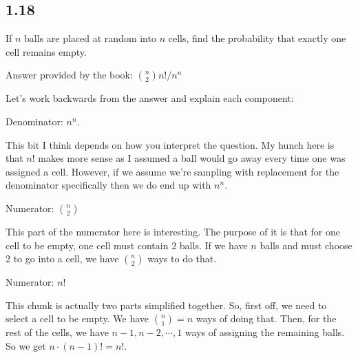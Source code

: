 \subsection*{1.18}

If $n$ balls are placed at random into $n$ cells, find the probability that exactly one cell remains empty.

\noindent Answer provided by the book: ${n \choose 2} n! / n^{n}$

Let's work backwards from the answer and explain each component:

\noindent Denominator: $n^n$. 

This bit I think depends on how you interpret the question. My hunch here is that $n!$ makes more sense as I assumed a ball would go away every time one was assigned a cell. However, if we assume we're sampling with replacement for the denominator specifically then we do end up with $n^n$.

\noindent Numerator: ${ n \choose 2}$

This part of the numerator here is interesting. The purpose of it is that for one cell to be empty, one cell must contain 2 balls. If we have $n$ balls and must choose 2 to go into a cell, we have ${ n \choose 2}$ ways to do that.

\noindent Numerator: $n!$

This chunk is actually two parts simplified together. So, first off, we need to select a cell to be empty. We have ${n \choose 1} = n$ ways of doing that. Then, for the rest of the cells, we have $n-1, n-2, \cdots, 1$ ways of assigning the remaining balls. So we get $n \cdot (n-1)! = n!$.
